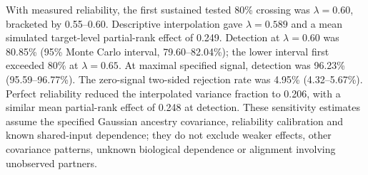With measured reliability, the first sustained tested 80\% crossing was $\lambda=0.60$, bracketed by 0.55--0.60. Descriptive interpolation gave $\lambda=0.589$ and a mean simulated target-level partial-rank effect of 0.249. Detection at $\lambda=0.60$ was 80.85\% (95\% Monte Carlo interval, 79.60--82.04\%); the lower interval first exceeded 80\% at $\lambda=0.65$. At maximal specified signal, detection was 96.23\% (95.59--96.77\%). The zero-signal two-sided rejection rate was 4.95\% (4.32--5.67\%). Perfect reliability reduced the interpolated variance fraction to 0.206, with a similar mean partial-rank effect of 0.248 at detection. These sensitivity estimates assume the specified Gaussian ancestry covariance, reliability calibration and known shared-input dependence; they do not exclude weaker effects, other covariance patterns, unknown biological dependence or alignment involving unobserved partners.
